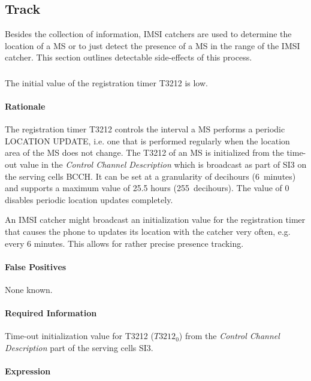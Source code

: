 \documentclass[a4paper,11pt,notitlepage,bigheadings,oneside]{scrartcl}
\begin{document}
\subsection{Track}

Besides the collection of information, IMSI catchers are used to determine the
location of a MS or to just detect the presence of a MS in the range of the
IMSI catcher. This section outlines detectable side-effects of this process.

\subsubsection{}

The initial value of the registration timer T3212 is low.

\paragraph{Rationale}

The registration timer T3212 controls the interval a MS performs a periodic
LOCATION UPDATE, i.e. one that is performed regularly when the location area of
the MS does not change. The T3212 of an MS is initialized from the time-out
value in the \emph{Control Channel Description} which is broadcast as part of
SI3 on the serving cells BCCH. It can be set at a granularity of decihours
(6~minutes) and supports a maximum value of 25.5 hours (255~decihours). The
value of 0 disables periodic location updates completely.

An IMSI catcher might broadcast an initialization value for the registration
timer that causes the phone to updates its location with the catcher very
often, e.g. every 6 minutes. This allows for rather precise presence tracking.

\paragraph{False Positives}

None known.

\paragraph{Required Information}

Time-out initialization value for T3212 ($T3212_0$) from the \emph{Control
Channel Description} part of the serving cells SI3.

\paragraph{Expression}
\end{document}
